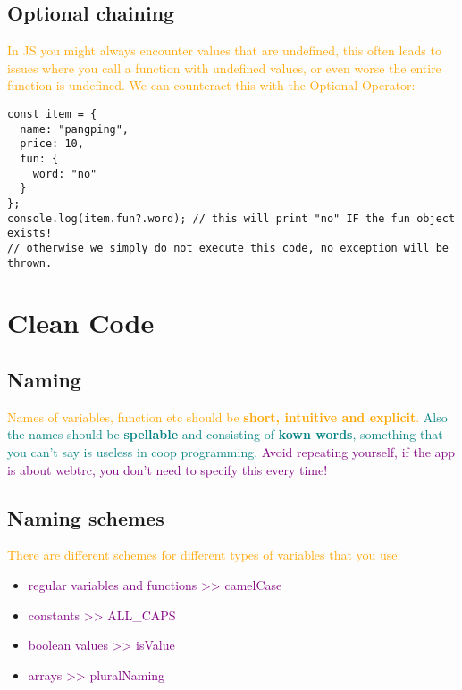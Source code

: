 \documentclass[main.tex,fontsize=6pt,paper=a4,paper=landscape,DIV=calc,]{scrartcl}
\begin{document}
\begin{multicols*}{4}
\subsection{Optional chaining}  
\textcolor{orange}{In JS you might always encounter values that are undefined, this often leads to issues where you call a function with undefined values, or even worse the entire function is undefined.\newline
We can counteract this with the Optional Operator:}
\vspace{-2mm}
\begin{lstlisting}
const item = {
  name: "pangping",
  price: 10, 
  fun: {
    word: "no"
  }
};
console.log(item.fun?.word); // this will print "no" IF the fun object exists!
// otherwise we simply do not execute this code, no exception will be thrown.
\end{lstlisting}
\vspace{2mm}


\section{Clean Code}

\subsection{Naming}  
\textcolor{orange}{Names of variables, function etc should be \textbf{short, intuitive and explicit}.}\newline
\textcolor{teal}{Also the names should be \textbf{spellable} and consisting of \textbf{kown words}, something that you can't say is useless in coop programming.}\newline
\textcolor{purple}{Avoid repeating yourself, if the app is about webtrc, you don't need to specify this every time!}

\subsection{Naming schemes}  
\textcolor{orange}{There are different schemes for different types of variables that you use.}
\begin{itemize}
\item \textcolor{purple}{regular variables and functions >> camelCase}
\item \textcolor{purple}{constants >> ALL\_CAPS}
\item \textcolor{purple}{boolean values >> isValue}
\item \textcolor{purple}{arrays >> pluralNaming}
\end{itemize} 


\end{multicols*}
\end{document}
